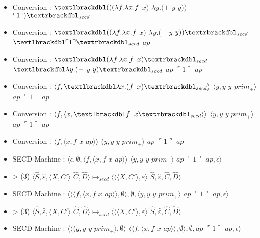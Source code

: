 \documentclass[10pt,a4paper]{article}
\begin{document}
				\begin{itemize}
					\item[] Conversion : $\textlbrackdbl(((\lambda f.\lambda x.f$ $x)$ $\lambda y.(+$ $y$ $y))$ $\ulcorner 1\urcorner)\textrbrackdbl_{secd}$
					\item[] Conversion : $\textlbrackdbl((\lambda f.\lambda x.f$ $x)$ $\lambda y.(+$ $y$ $y))\textrbrackdbl_{secd}$ $\textlbrackdbl\ulcorner 1\urcorner\textrbrackdbl_{secd}$ $ap$
					\item[] Conversion : $\textlbrackdbl(\lambda f.\lambda x.f$ $x)\textrbrackdbl_{secd}$ $\textlbrackdbl\lambda y.(+$ $y$ $y)\textrbrackdbl_{secd}$ $ap$ $\ulcorner 1\urcorner$ $ap$
					\item[] Conversion : $\langle f,\textlbrackdbl\lambda x.(f$ $x)\textrbrackdbl_{secd}\rangle$ $\langle y,y$ $y$ $prim_{+}\rangle$ $ap$ $\ulcorner 1\urcorner$ $ap$
					\item[] Conversion : $\langle f,\langle x,\textlbrackdbl f$ $x\textrbrackdbl_{secd}\rangle\rangle$ $\langle y,y$ $y$ $prim_{+}\rangle$ $ap$ $\ulcorner 1\urcorner$ $ap$
					\item[] Conversion : $\langle f,\langle x,f$ $x$ $ap\rangle\rangle$ $\langle y,y$ $y$ $prim_{+}\rangle$ $ap$ $\ulcorner 1\urcorner$ $ap$
					\item[] SECD Machine : $\langle\epsilon,\emptyset,\langle f,\langle x,f$ $x$ $ap\rangle\rangle$ $\langle y,y$ $y$ $prim_{+}\rangle$ $ap$ $\ulcorner 1\urcorner$ $ap,\epsilon\rangle$ 
					\item[] > (3) $\langle\widehat{S},\widehat{\varepsilon},\langle X,C'\rangle$ $\widehat{C},\widehat{D}\rangle \longmapsto_{secd} \langle\langle\langle X,C'\rangle,\varepsilon\rangle$ $\widehat{S},\widehat{\varepsilon},\widehat{C},\widehat{D}\rangle$
					\item[] SECD Machine : $\langle\langle\langle f,\langle x,f$ $x$ $ap\rangle\rangle,\emptyset\rangle,\emptyset,\langle y,y$ $y$ $prim_{+}\rangle$ $ap$ $\ulcorner 1\urcorner$ $ap,\epsilon\rangle$ 
					\item[] > (3) $\langle\widehat{S},\widehat{\varepsilon},\langle X,C'\rangle$ $\widehat{C},\widehat{D}\rangle \longmapsto_{secd} \langle\langle\langle X,C'\rangle,\varepsilon\rangle$ $\widehat{S},\widehat{\varepsilon},\widehat{C}\widehat{,D}\rangle$
					\item[] SECD Machine : $\langle\langle\langle y,y$ $y$ $prim_{+}\rangle,\emptyset\rangle$ $\langle\langle f,\langle x,f$ $x$ $ap\rangle\rangle,\emptyset\rangle,\emptyset,ap$ $\ulcorner 1\urcorner$ $ap,\epsilon\rangle$

\end{itemize}
\end{document}
